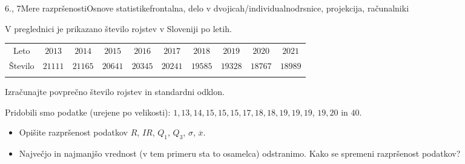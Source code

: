 \begin{priprava}{6., 7}{}{Mere razpršenosti}{Osnove statistike}{frontalna, delo v dvojicah/individualno}{drsnice, projekcija, računalniki}
\begin{naloga}
V preglednici je prikazano število rojstev v Sloveniji po letih. 

 \begin{table}[H]
     \centering
     \begin{tabular}{||c|c|c|c|c|c|c|c|c|c||} 
     \hhline{|t:==========:t|}
     \rowcolor[rgb]{0.843,0.718,0.718} 
     Leto   & $2013$ & $2014$ & $2015$ & $2016$ & $2017$ & $2018$ & $2019$ & $2020$ & $2021$    \\ 
     \hhline{|:==========:|}
     Število  & $21111$ & $21165$ & $20641$ & $20345$ & $20241$ & $19585$ & $19328$ & $18767$ & $18989$ \\ 
     \hhline{|b:==========:b|}
     \end{tabular}
 \end{table}

 Izračunajte povprečno število rojstev in standardni odklon.

\end{naloga}


 \begin{naloga}

    Pridobili smo podatke (urejene po velikosti): $1, 13, 14, 15, 15, 15, 17, 18, 18, 19, 19, 19$, $19, 20$ in $40$.
    \begin{itemize}
        \item Opišite razpršenost podatkov $R$, $IR$, $Q_1$, $Q_3$, $\sigma$, $\overline{x}$.
        \item Največjo in najmanjšo vrednost (v tem primeru sta to osamelca) odstranimo. Kako se spremeni razpršenost podatkov? 
    \end{itemize}
    
\end{naloga}





\end{priprava}